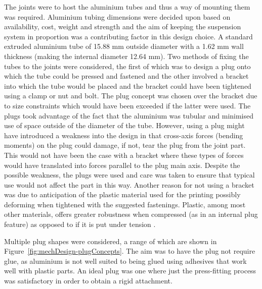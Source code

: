         The joints were to host the aluminium tubes and thus a way of mounting them was required. Aluminium tubing dimensions were decided upon based on availability, cost, weight and strength and the aim of keeping the suspension system in proportion was a contributing factor in this design choice. A standard extruded aluminium tube of 15.88 mm outside diameter with a 1.62 mm wall thickness (making the internal diameter 12.64 mm). Two methods of fixing the tubes to the joints were considered, the first of which was to design a plug onto which the tube could be pressed and fastened and the other involved a bracket into which the tube would be placed and the bracket could have been tightened using a clamp or nut and bolt. The plug concept was chosen over the bracket due to size constraints which would have been exceeded if the latter were used. The plugs took advantage of the fact that the aluminium was tubular and minimised use of space outside of the diameter of the tube. However, using a plug might have introduced a weakness into the design in that cross-axis forces (bending moments) on the plug could damage, if not, tear the plug from the joint part. This would not have been the case with a bracket where these types of forces would have translated into forces parallel to the plug main axis. Despite the possible weakness, the plugs were used and care was taken to ensure that typical use would not affect the part in this way. Another reason for not using a bracket was due to anticipation of the plastic material used for the printing possibly deforming when tightened with the suggested fastenings. Plastic, among most other materials, offers greater robustness when compressed (as in an internal plug feature) as opposed to if it is put under tension \cite{makerbotStrength}.
        
        Multiple plug shapes were considered, a range of which are shown in Figure~\ref{fig:mechDesign-plugConcepts}. The aim was to have the plug not require glue, as aluminium is not well suited to being glued using adhesives that work well with plastic parts. An ideal plug was one where just the press-fitting process was satisfactory in order to obtain a rigid attachment.
        
